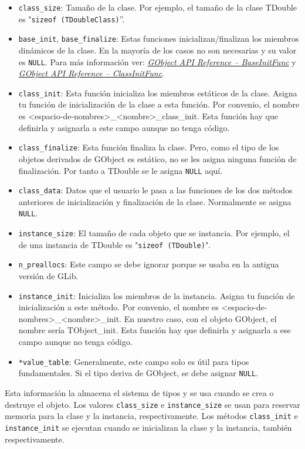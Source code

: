 \begin{itemize}
  \tightlist
\item \texttt{class\_size}: Tamaño de la clase. Por ejemplo, el tamaño de la clase
  \textsf{TDouble} es "\texttt{sizeof (TDoubleClass)}''.
\item \texttt{base\_init}, \texttt{base\_finalize}: Estas funciones inicializan/finalizan
  los miembros dinámicos de la clase. En la mayoría de los casos no son necesarias y
  su valor es \texttt{NULL}.
  Para más información ver:
  \href{https://docs.gtk.org/gobject/callback.BaseInitFunc.html}
  {\emph{\textsf{GObject API Reference -- BaseInitFunc}}} y
  \href{https://docs.gtk.org/gobject/callback.ClassInitFunc.html}
  {\emph{\textsf{GObject API Reference -- ClassInitFunc}}}.
\item \texttt{class\_init}: Esta función inicializa los miembros estáticos de la clase. Asigna tu función de
  inicialización de la clase a esta función.
  Por convenio, el nombre es \textsf{<espacio-de-nombres>\_<nombre>\_class\_init}.
  Esta función hay que definirla y asignarla a este campo aunque no tenga código.
\item \texttt{class\_finalize}: Esta función finaliza la clase. Pero, como el tipo de los objetos derivados de
  \textsf{GObject} es estático, no se les asigna ninguna función de finalización. Por tanto a \textsf{TDouble}
  se le asigna \texttt{NULL} aquí.
\item \texttt{class\_data}: Datos que el usuario le pasa a las funciones de los dos métodos anteriores
  de inicialización y finalización de la clase. Normalmente se asigna \texttt{NULL}.
\item \texttt{instance\_size}: El tamaño de cada objeto que se instancia. Por ejemplo, el de una instancia
  de \textsf{TDouble} es "\texttt{sizeof (TDouble)}".
\item \texttt{n\_preallocs}: Este campo se debe ignorar porque se usaba en la antigua versión de \textsf{GLib}.
\item \texttt{instance\_init}: Inicializa los miembros de la instancia. Asigna tu función de inicialización a este
  método. Por convenio, el nombre es \textsf{<espacio-de-nombres>\_<nombre>\_init}. En nuestro caso, con
  el objeto \textsf{GObject}, el nombre sería \textsf{TObject\_init}.
  Esta función hay que definirla y asignarla a ese campo aunque no tenga código.
\item \texttt{*value\_table}:  Generalmente, este campo solo es útil para tipos fundamentales. Si el tipo deriva
  de \textsf{GObject}, se debe asignar \texttt{NULL}.
\end{itemize}
Esta información la almacena el sistema de tipos y se usa cuando se crea o destruye el objeto.
Los valores \texttt{class\_size} e \texttt{instance\_size} se usan para reservar memoria para la clase y la instancia,
respectivamente. Los métodos \texttt{class\_init} e \texttt{instance\_init} se ejecutan cuando se inicializan
la clase y la instancia, también respectivamente.

